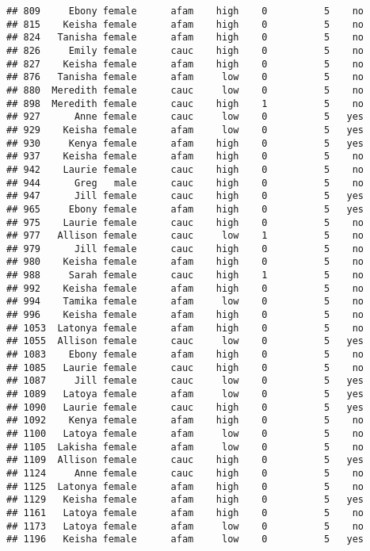 \documentclass[
]{article}
\begin{document}
\begin{verbatim}
## 809     Ebony female      afam    high    0          5    no
## 815    Keisha female      afam    high    0          5    no
## 824   Tanisha female      afam    high    0          5    no
## 826     Emily female      cauc    high    0          5    no
## 827    Keisha female      afam    high    0          5    no
## 876   Tanisha female      afam     low    0          5    no
## 880  Meredith female      cauc     low    0          5    no
## 898  Meredith female      cauc    high    1          5    no
## 927      Anne female      cauc     low    0          5   yes
## 929    Keisha female      afam     low    0          5   yes
## 930     Kenya female      afam    high    0          5   yes
## 937    Keisha female      afam    high    0          5    no
## 942    Laurie female      cauc    high    0          5    no
## 944      Greg   male      cauc    high    0          5    no
## 947      Jill female      cauc    high    0          5   yes
## 965     Ebony female      afam    high    0          5   yes
## 975    Laurie female      cauc    high    0          5    no
## 977   Allison female      cauc     low    1          5    no
## 979      Jill female      cauc    high    0          5    no
## 980    Keisha female      afam    high    0          5    no
## 988     Sarah female      cauc    high    1          5    no
## 992    Keisha female      afam    high    0          5    no
## 994    Tamika female      afam     low    0          5    no
## 996    Keisha female      afam    high    0          5    no
## 1053  Latonya female      afam    high    0          5    no
## 1055  Allison female      cauc     low    0          5   yes
## 1083    Ebony female      afam    high    0          5    no
## 1085   Laurie female      cauc    high    0          5    no
## 1087     Jill female      cauc     low    0          5   yes
## 1089   Latoya female      afam     low    0          5   yes
## 1090   Laurie female      cauc    high    0          5   yes
## 1092    Kenya female      afam    high    0          5    no
## 1100   Latoya female      afam     low    0          5    no
## 1105  Lakisha female      afam     low    0          5    no
## 1109  Allison female      cauc    high    0          5   yes
## 1124     Anne female      cauc    high    0          5    no
## 1125  Latonya female      afam    high    0          5    no
## 1129   Keisha female      afam    high    0          5   yes
## 1161   Latoya female      afam    high    0          5    no
## 1173   Latoya female      afam     low    0          5    no
## 1196   Keisha female      afam     low    0          5   yes

\end{verbatim}
\end{document}
